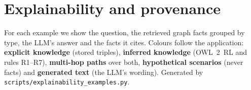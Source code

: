\section{Explainability and provenance}\label{sec:explain}
For each example we show the question, the retrieved graph facts grouped by type, the LLM's answer and the facts
it cites. Colours follow the application:
\textcolor{kgexplicit}{\textbf{explicit knowledge}} (stored triples),
\textcolor{kginferred}{\textbf{inferred knowledge}} (OWL~2~RL and rules R1--R7),
\textcolor{kgpath}{\textbf{multi-hop paths}} over both,
\textcolor{kgscenario}{\textbf{hypothetical scenarios}} (never facts) and
\textcolor{kggenerated}{\textbf{generated text}} (the LLM's wording). Generated by
\texttt{scripts/explainability\_examples.py}.


